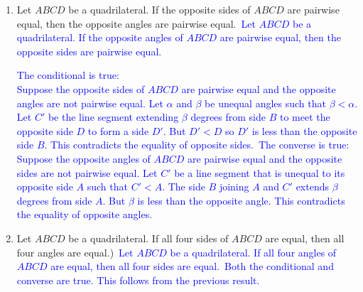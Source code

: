 \documentclass[13.5pt]{article}
\begin{document}
\begin{enumerate}
\begin{enumerate}
\item{Let \(ABCD\) be a quadrilateral. If the opposite sides of \(ABCD\) are pairwise equal, then the opposite angles are pairwise equal.}\
\textcolor{blue} {Let \(ABCD\) be a quadrilateral. If the opposite angles of \(ABCD\) are pairwise equal, then the opposite sides are pairwise equal.}

\textcolor{blue} {The conditional is true:}\\
\textcolor{blue} {Suppose the opposite sides of \(ABCD\) are pairwise equal and the opposite angles are not pairwise equal.} 
\textcolor{blue} {Let \(\alpha\) and \(\beta\) be unequal angles such that \(\beta <\alpha\). }
\textcolor{blue} {Let \(C'\) be the line segment extending \(\beta\) degrees from side \(B\) to meet the opposite side \(D\) to form a side \(D'\). But \(D'< D\) so \(D'\) is less than the opposite side \(B\). This contradicts the equality of opposite sides.}\
\textcolor{blue} {The converse is true:}\\
\textcolor{blue} {Suppose the opposite angles of \(ABCD\) are pairwise equal and the opposite sides are not pairwise equal.} 
\textcolor{blue} {Let \(C'\) be a line segment that is unequal to its opposite side \(A\) such that \(C'<A\). The side \(B\) joining \(A\) and \(C'\) extends \(\beta\) degrees from side \(A\). But \(\beta\) is less than the opposite angle. This contradicts the equality of opposite angles.}
\item{Let \(ABCD\) be a quadrilateral. If all four sides of \(ABCD\) are equal, then all four angles are equal.)}\
\textcolor{blue} {Let \(ABCD\) be a quadrilateral. If all four angles of \(ABCD\) are equal, then all four sides are equal.}\
\textcolor{blue} {Both the conditional and converse are true. This follows from the previous result.}


\end{enumerate}
\end{enumerate}
\end{document}
